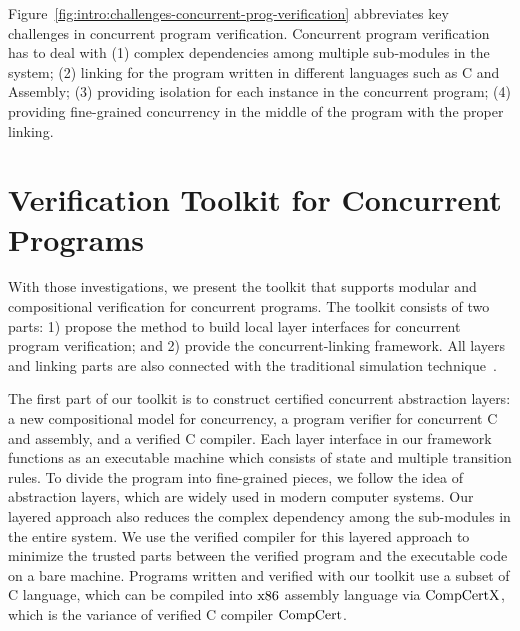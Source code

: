 Figure~\ref{fig:intro:challenges-concurrent-prog-verification} abbreviates key challenges in concurrent program verification. 
Concurrent program verification has to deal with (1) complex dependencies among multiple sub-modules in the system; (2) linking  for the program written in different languages such as C and Assembly; (3) providing isolation for each instance in the concurrent program; (4) 
providing fine-grained concurrency in the middle of the program with the proper linking. 


\section{Verification Toolkit for Concurrent Programs}
\label{chapter:introduction:sec:verification-toolkit-for-concurrent-programs}
%
With those investigations, we present the toolkit that supports modular and compositional verification for concurrent programs. 
The toolkit consists of two parts: 1) propose the method to build local layer interfaces for concurrent program verification; and 
2) provide the concurrent-linking framework. All layers and linking parts are also connected with the traditional simulation 
technique~\cite{compcert, deepspec}. 
 
The first part of our toolkit is to construct certified concurrent abstraction layers: a new compositional model for concurrency, 
a program verifier for concurrent C and assembly, and a verified C compiler. 
Each layer interface in our framework functions as an executable machine which consists of state and multiple transition rules. 
To divide the program into fine-grained pieces, we follow the idea of abstraction layers, which are widely used in modern computer systems. 
Our layered approach also reduces the complex dependency among the sub-modules in the entire system.
We use the verified compiler for this layered approach to minimize the trusted parts between the verified program and the executable code 
on a bare machine. Programs written and verified with our toolkit use a subset of C language, 
which can be compiled into $\mathrm{x86}$ assembly language via $\mathrm{CompCertX}$, which is the variance of verified C compiler $\mathrm{CompCert}$.

